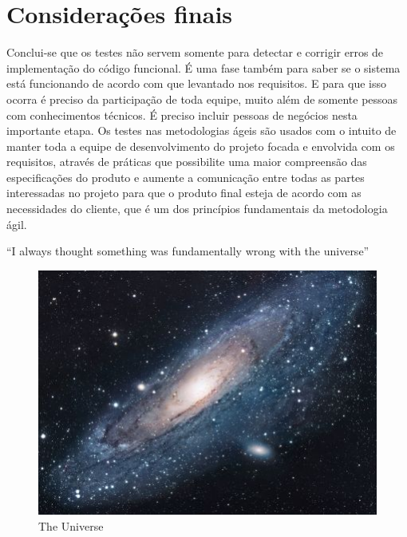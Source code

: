 \documentclass{article}
\begin{document}
\section{Considerações finais}

    Conclui-se que os testes não servem somente para detectar e corrigir erros  de  implementação do código funcional. É uma fase também para saber se o
sistema está funcionando de acordo com que levantado nos requisitos. E para que isso ocorra é preciso da participação de toda equipe, muito além de
somente pessoas com conhecimentos técnicos. É preciso incluir pessoas de negócios nesta importante etapa. Os testes nas metodologias ágeis são usados
com o intuito de manter toda a equipe de desenvolvimento do projeto focada e envolvida com os requisitos, através de práticas que possibilite uma maior
compreensão das especificações do produto e aumente a comunicação entre todas as partes interessadas no projeto para que o produto final esteja de
acordo com as necessidades do cliente, que é um dos princípios fundamentais da metodologia ágil.

``I always thought something was fundamentally wrong with the universe'' \citep{adams1995hitchhiker}


\begin{figure}[h!]
\centering
\includegraphics[scale=1.7]{universe}
\caption{The Universe}
\label{fig:universe}
\end{figure}



\end{document}
